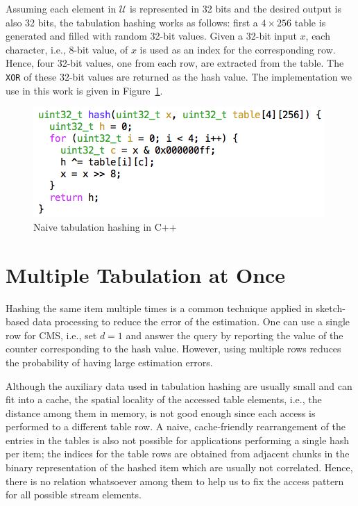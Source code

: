\documentclass[10pt, review=true,sigconf]{acmart}
\begin{document}
Assuming each element in $\mathcal{U}$ is represented in 32 bits and the desired output is also 32 bits, the tabulation hashing works as follows: first a $4 \times 256$ table is generated and filled with random 32-bit values. Given a 32-bit input $x$, each character, i.e., 8-bit value, of $x$ is used as an index for the corresponding row. Hence, four 32-bit values, one from each row, are extracted from the table. The {\tt XOR} of these 32-bit values are returned as the hash value. The implementation we use in this work is given in Figure~\ref{fig:tabulation_seq}.

\begin{figure}[htbp]
\begin{center}
\includegraphics[width=0.90\linewidth]{tabular_code.png}
\caption{Naive tabulation hashing in C++}
\label{fig:tabulation_seq}
\end{center}
\end{figure}

\section{Multiple Tabulation at Once}\label{sec:tab}
Hashing the same item multiple times is a common technique applied in sketch-based data processing to reduce the error of the estimation. One can use a single row for CMS, i.e., set $d = 1$ and answer the query by reporting the value of the counter corresponding to the hash value. However, using multiple rows reduces the probability of having large estimation errors. 

Although the auxiliary data used in tabulation hashing are usually small and can fit into a cache, the spatial locality of the accessed table elements, i.e., the distance among them in memory, is not good enough since each access is performed to a different table row. A naive, cache-friendly rearrangement of the entries in the tables is also not possible for applications performing a single hash per item; the indices for the table rows are obtained from adjacent chunks in the binary representation of the hashed item which are usually not correlated. Hence, there is no relation whatsoever among them to help us to fix the access pattern for all possible stream elements.
\end{document}
